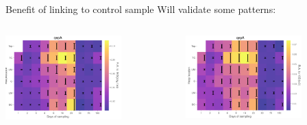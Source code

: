 \documentclass[mathserif,11pt]{beamer}
\begin{document}
\begin{frame}{Benefit of linking to control sample}
Will validate some patterns:
	\begin{columns}
		\begin{column}{0.5\textwidth}
		\centering
			\includegraphics[width=0.7\textwidth]{Figures/same_errorbar.png}
		\end{column}
		\begin{column}{0.5\textwidth}
		\centering
			\includegraphics[width=0.7\textwidth]{Figures/same_errorbar_day0.png}
		\end{column}
	\end{columns}
\end{frame}
\end{document}
